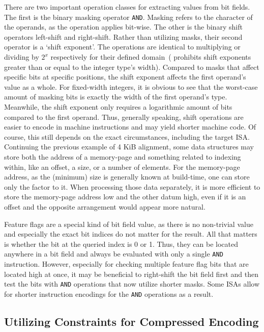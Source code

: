 There are two important operation classes for extracting values from bit fields. The first is the binary masking operator \texttt{AND}. Masking refers to the character of the operands, as the operation applies bit-wise. The other is the binary shift operators left-shift and right-shift. Rather than utilizing masks, their second operator is a `shift exponent'. The operations are identical to multiplying or dividing by $2^x$ respectively for their defined domain~( prohibits shift exponents greater than or equal to the integer type's width). Compared to masks that affect specific bits at specific positions, the shift exponent affects the first operand's value as a whole. For fixed-width integers, it is obvious to see that the worst-case amount of masking bits is exactly the width of the first operand's type. Meanwhile, the shift exponent only requires a logarithmic amount of bits compared to the first operand. Thus, generally speaking, shift operations are easier to encode in machine instructions and may yield shorter machine code. Of course, this still depends on the exact circumstances, including the target \gls{ISA}.
Continuing the previous example of 4 KiB alignment, some data structures may store both the address of a \gls{memory-page} and something related to indexing within, like an offset, a size, or a number of elements. For the \gls{memory-page} address, as the (minimum) size is generally known at build-time, one can store only the factor to it. When processing those data separately, it is more efficient to store the \gls{memory-page} address low and the other datum high, even if it is an offset and the opposite arrangement would appear more natural.

Feature flags are a special kind of bit field value, as there is no non-trivial value and especially the exact bit indices do not matter for the result. All that matters is whether the bit at the queried index is 0 or 1. Thus, they can be located anywhere in a bit field and always be evaluated with only a single \texttt{AND} instruction. However, especially for checking multiple feature flag bits that are located high at once, it may be beneficial to right-shift the bit field first and then test the bits with \texttt{AND} operations that now utilize shorter masks. Some \glspl{ISA} allow for shorter instruction encodings for the \texttt{AND} operations as a result.

\subsection{Utilizing Constraints for Compressed Encoding}
\label{sec:constr_packing}


